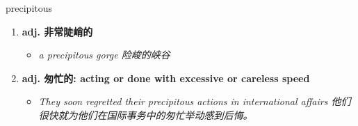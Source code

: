 
\begin{frame}
{\huge precipitous}
\begin{center}
\begin{enumerate}\Large
  \item \textbf{adj. 非常陡峭的}
  \begin{itemize}
    \item \em{\Large{a precipitous gorge 险峻的峡谷}}
  \end{itemize}
  \item \textbf{adj. 匆忙的: acting or done with excessive or careless speed}
  \begin{itemize}
    \item \em{\Large{They soon regretted their precipitous actions in international affairs 他们很快就为他们在国际事务中的匆忙举动感到后悔。}}
  \end{itemize}
\end{enumerate}
\end{center}
\end{frame}
